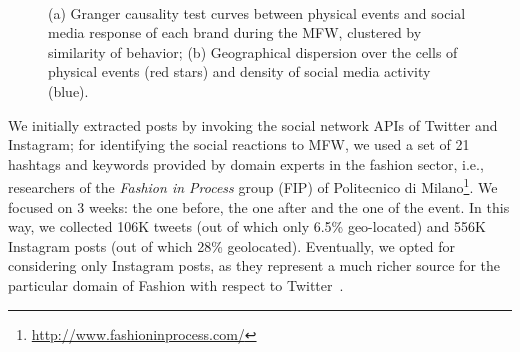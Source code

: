 {\begin{figure}[p]
\centering
{}\\
\hspace{5pt} 
\caption{(a) Granger causality test curves between physical events and social media response of each brand during the MFW, clustered by similarity of behavior; (b) Geographical dispersion over the cells of physical events (red stars)
and density of social media activity (blue).}
\label{fig:fashion_fig}
\end{figure}

We initially extracted posts by invoking the social network APIs of Twitter and Instagram; for identifying the social reactions to MFW, we used a set of 21 hashtags and keywords provided by domain experts in the fashion sector, i.e., researchers of the \textit{Fashion in Process} group (FIP) of Politecnico di Milano\footnote{\url{http://www.fashioninprocess.com/}}.
We focused on 3 weeks: the one before, the one after and the one of the event. In this way, we collected 106K tweets (out of which only 6.5\% geo-located) and 556K Instagram posts (out of which 28\% geolocated).
Eventually, we opted for considering only Instagram posts, as they represent a much richer source for the particular domain of Fashion with respect to Twitter~\cite{Brambilla2017, BrambillaSpatial2017}.

}
